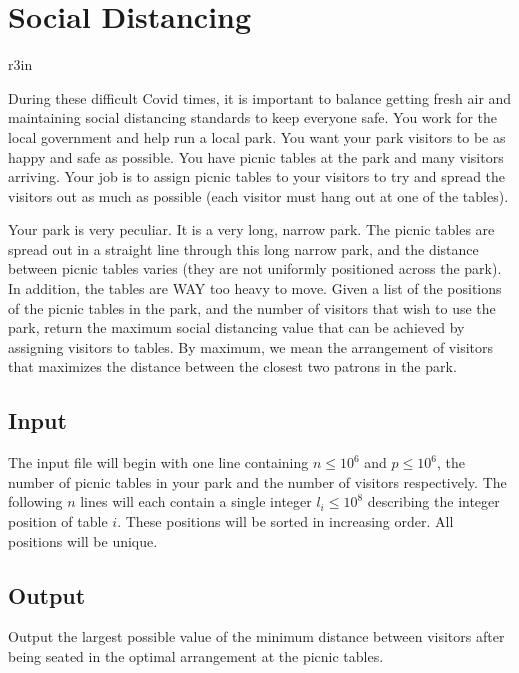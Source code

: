 \documentclass[11pt]{article}
\begin{document}
\section*{Social Distancing}


\begin{wrapfigure}{r}{3in}
\vspace{-10pt}
\vspace{-30pt}
\end{wrapfigure}

During these difficult Covid times, it is important to balance getting fresh air and maintaining social distancing standards to keep everyone safe. You work for the local government and help run a local park. You want your park visitors to be as happy and safe as possible. You have picnic tables at the park and many visitors arriving. Your job is to assign picnic tables to your visitors to try and spread the visitors out as much as possible (each visitor must hang out at one of the tables).

Your park is very peculiar. It is a very long, narrow park. The picnic tables are spread out in a straight line through this long narrow park, and the distance between picnic tables varies (they are not uniformly positioned across the park). In addition, the tables are WAY too heavy to move. Given a list of the positions of the picnic tables in the park, and the number of visitors that wish to use the park, return the maximum social distancing value that can be achieved by assigning visitors to tables. By maximum, we mean the arrangement of visitors that maximizes the distance between the closest two patrons in the park.

\subsection*{Input}
The input file will begin with one line containing $n \leq 10^6$ and $p \leq 10^6$, the number of picnic tables in your park and the number of visitors respectively. The following $n$ lines will each contain a single integer $l_i \leq 10^8$ describing the integer position of table $i$. These positions will be sorted in increasing order. All positions will be unique.

\subsection*{Output}
Output the largest possible value of the minimum distance between visitors after being seated in the optimal arrangement at the picnic tables.
\end{document}
